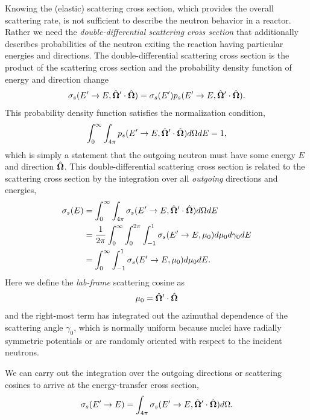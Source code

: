 Knowing the (elastic) scattering cross section, which provides the overall scattering rate, is not sufficient to describe the neutron behavior in a reactor. Rather we need the \emph{double-differential scattering cross section} that additionally describes probabilities of the neutron exiting the reaction having particular energies and directions. The double-differential scattering cross section is the product of the scattering cross section and the probability density function of energy and direction change
\begin{align}
  \sigma_s(E' \rightarrow E, \hat{\mathbf{\Omega}}' \cdot \hat{\mathbf{\Omega}}) = \sigma_s(E') p_s(E' \rightarrow E, \hat{\mathbf{\Omega}}' \cdot \hat{\mathbf{\Omega}}) .
\end{align}
This probability density function satisfies the normalization condition,
\begin{align}
  \int_0^\infty \int_{4\pi}  p_s(E' \rightarrow E, \hat{\mathbf{\Omega}}' \cdot \hat{\mathbf{\Omega}}) d\Omega dE = 1,
\end{align}
which is simply a statement that the outgoing neutron must have some energy $E$ and direction $\hat{\mathbf{\Omega}}$. This double-differential scattering cross section is related to the scattering cross section by the integration over all \emph{outgoing} directions and energies,
\begin{align}
  \sigma_s(E) 	&= \int_0^\infty \int_{4\pi} \sigma_s(E' \rightarrow E, \hat{\mathbf{\Omega}}' \cdot \hat{\mathbf{\Omega}})  d\Omega dE \nonumber \\
  				&= \frac{1}{2\pi} \int_0^\infty \int_0^{2\pi} \int_{-1}^1 \sigma_s(E' \rightarrow E, \mu_0 )  d\mu_0 d\gamma_0 dE \nonumber \\
  				&= \int_0^\infty \int_{-1}^1  \sigma_s(E' \rightarrow E, \mu_0 )  d\mu_0 dE .
\end{align}
Here we define the \emph{lab-frame} scattering cosine as
\begin{align}
  \mu_0 = \hat{\mathbf{\Omega}}' \cdot \hat{\mathbf{\Omega}}
\end{align}
and the right-most term has integrated out the azimuthal dependence of the scattering angle $\gamma_0$, which is normally uniform because nuclei have radially symmetric potentials or are randomly oriented with respect to the incident neutrons. 

We can carry out the integration over the outgoing directions or scattering cosines to arrive at the energy-transfer cross section,
\begin{align}
  \sigma_s(E' \rightarrow E) =  \int_{4\pi} \sigma_s(E' \rightarrow E, \hat{\mathbf{\Omega}}' \cdot \hat{\mathbf{\Omega}})  d\Omega .
\end{align}

